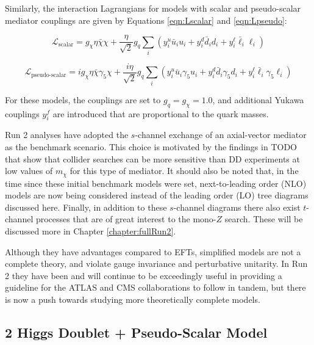 Similarly, the interaction Lagrangians for models with scalar and pseudo-scalar mediator couplings are given by Equations \ref{eqn:Lscalar} and \ref{eqn:Lpseudo}:

\begin{equation}
\mathcal{L}_\text{scalar} = g_\chi \eta \bar{\chi} \chi + \frac{\eta}{\sqrt{2}} g_q \sum_i \left( y_i^u \bar{u}_i u_i + y_i^d \bar{d}_i d_i + y_i^\ell \bar{\ell}_i \ell_i \right)
\label{eqn:Lscalar}
\end{equation}

\begin{equation}
\mathcal{L}_\text{pseudo-scalar} = i g_\chi \eta \bar{\chi} \gamma_5 \chi + \frac{i \eta}{\sqrt{2}} g_q \sum_i \left( y_i^u \bar{u}_i \gamma_5 u_i + y_i^d \bar{d}_i \gamma_5 d_i + y_i^\ell \bar{\ell}_i \gamma_5 \ell_i \right)
\label{eqn:Lpseudo}
\end{equation}

\noindent For these models, the couplings are set to $g_q = g_\chi = 1.0$, and additional Yukawa couplings $y_i^f$ are introduced that are proportional to the quark masses. 

Run 2 analyses have adopted the $s$-channel exchange of an axial-vector mediator as the benchmark scenario. This choice is motivated by the findings in TODO that show that collider searches can be more sensitive than DD experiments at low values of $m_\chi$ for this type of mediator. It should also be noted that, in the time since these initial benchmark models were set, next-to-leading order (NLO) models are now being considered instead of the leading order (LO) tree diagrams discussed here. Finally, in addition to these $s$-channel diagrams there also exist $t$-channel processes that are of great interest to the mono-$Z$ search. These will be discussed more in Chapter \ref{chapter:fullRun2}.

Although they have advantages compared to EFTs, simplified models are not a complete theory, and violate gauge invariance and perturbative unitarity. In Run 2 they have been and will continue to be exceedingly useful in providing a guideline for the ATLAS and CMS collaborations to follow in tandem, but there is now a push towards studying more theoretically complete models.

\subsection{2 Higgs Doublet + Pseudo-Scalar Model}


